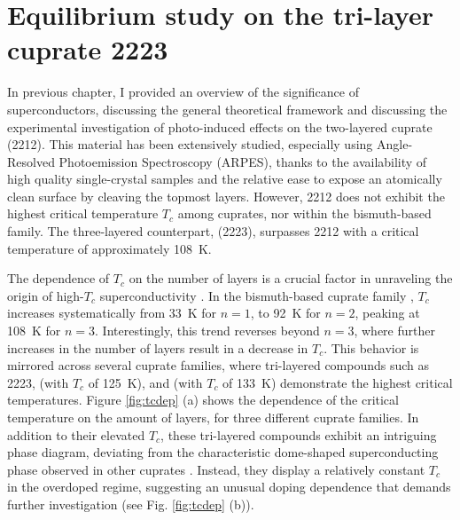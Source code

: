 \chapter{Equilibrium study on the tri-layer cuprate 2223}

In previous chapter, I provided an overview of the significance of superconductors, discussing the general theoretical framework and discussing the experimental investigation of photo-induced effects on the two-layered cuprate  (2212).
This material has been extensively studied, especially using Angle-Resolved Photoemission Spectroscopy (ARPES), thanks to the availability of high quality single-crystal samples and the relative ease to expose an atomically clean surface by cleaving the topmost layers.
However, 2212 does not exhibit the highest critical temperature $T_c$ among cuprates, nor within the bismuth-based family.
The three-layered counterpart,  (2223), surpasses 2212 with a critical temperature of approximately \qty{108}{\kelvin}.

The dependence of $T_c$ on the number of  layers is a crucial factor in unraveling the origin of high-$T_c$ superconductivity \cite{feng_electronic_2002, scott_layer_1994, chakravarty_explanation_2004,iyo_tc_2007,chu_hole-doped_2015,luo_electronic_2023}.
In the bismuth-based cuprate family , $T_c$ increases systematically from \qty{33}{\kelvin} for $n=1$, to \qty{92}{\kelvin} for $n=2$, peaking at \qty{108}{\kelvin} for $n=3$.
Interestingly, this trend reverses beyond $n=3$, where further increases in the number of  layers result in a decrease in $T_c$.
This behavior is mirrored across several cuprate families, where tri-layered compounds such as 2223,  (with $T_c$ of \qty{125}{\kelvin}), and  (with $T_c$ of \qty{133}{\kelvin}) demonstrate the highest critical temperatures.
Figure \ref{fig:tcdep} (a) shows the dependence of the critical temperature on the amount of  layers, for three different cuprate families.
In addition to their elevated $T_c$, these tri-layered compounds exhibit an intriguing phase diagram, deviating from the characteristic dome-shaped superconducting phase observed in other cuprates \cite{fujii_doping_2002,piriou_effect_2008}.
Instead, they display a relatively constant $T_c$ in the overdoped regime, suggesting an unusual doping dependence that demands further investigation (see Fig. \ref{fig:tcdep} (b)).

